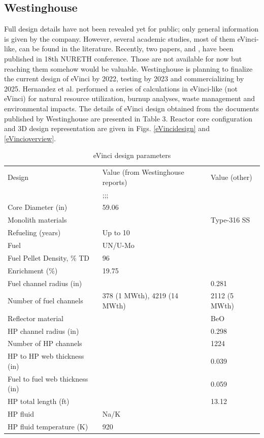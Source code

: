 \documentclass[10pt,a4paper]{article}
\begin{document}
\subsection{Westinghouse}
Full design details have not been revealed yet for public; only general information is given by the company. However, several academic studies, most of them eVinci-like, can be found in the literature. Recently, two papers, \cite{Xu19} and \cite{Wright19}, have been published in 18th NURETH conference. Those are not available for now but reaching them somehow would be valuable. Westinghouse is planning to finalize the current design of eVinci by 2022, testing by 2023 and commercializing by 2025. Hernandez et al. \cite{Hernandez19} performed a series of calculations in eVinci-like (not eVinci) for natural resource utilization, burnup analyses, waste management and environmental impacts. The details of eVinci design obtained from the documents published by Westinghouse are presented in Table 3. Reactor core configuration and 3D design representation are given in Figs. \ref{eVincidesign} and \ref{eVincioverview}.

\begin{table} [ht]
\begin{center}

\caption{eVinci design parameters}
\begin{tabular}{l  l  l}
\hline
Design 		&Value (from Westinghouse reports) 		& Value (other) \cite{Hernandez19}\\ 
	& 	\cite{IAEA18};\cite{Levinsky18};\cite{Yan20};\cite{Arafat19} 	&  \\ 
\hline
Core Diameter (in) 		&59.06 		&  \\ 
Monolith materials 		& 		& Type-316 SS	\\ 
Refueling (years) 		&Up to 10 		&  \\ 
Fuel 		&UN/U-Mo 		& 	 \\ 
Fuel Pellet Density, \% TD 		&96 		&  \\ 
Enrichment (\%) 		&19.75 		&  \\ 
Fuel channel radius (in) 		& 		& 0.281 \\ 
Number of fuel channels 		&378 (1 MWth), 4219 (14 MWth)		& 2112 (5 MWth) \\ 
Reflector material 		&		& BeO\\ 
HP channel radius (in) 		&		& 0.298\\ 
Number of HP channels 		& 		& 1224\\ 
HP to HP web thickness (in) 		& 		& 0.039\\ 
Fuel to fuel web thickness (in) 		& 		& 0.059\\ 
HP total length (ft) 		&		& 13.12\\ 
HP fluid 		&Na/K		& \\ 
HP fluid temperature (K) 		&920 		& \\ 
\hline

\end{tabular}
\end{center}
\end{table}
\end{document}
